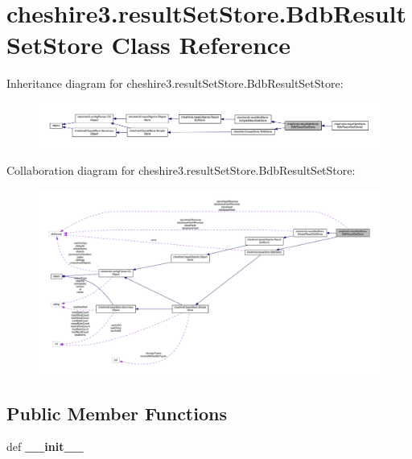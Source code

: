 \hypertarget{classcheshire3_1_1result_set_store_1_1_bdb_result_set_store}{\section{cheshire3.\-result\-Set\-Store.\-Bdb\-Result\-Set\-Store Class Reference}
\label{classcheshire3_1_1result_set_store_1_1_bdb_result_set_store}
}


Inheritance diagram for cheshire3.\-result\-Set\-Store.\-Bdb\-Result\-Set\-Store\-:
\nopagebreak
\begin{figure}[H]
\begin{center}
\leavevmode
\includegraphics[width=350pt]{classcheshire3_1_1result_set_store_1_1_bdb_result_set_store__inherit__graph}
\end{center}
\end{figure}


Collaboration diagram for cheshire3.\-result\-Set\-Store.\-Bdb\-Result\-Set\-Store\-:
\nopagebreak
\begin{figure}[H]
\begin{center}
\leavevmode
\includegraphics[width=350pt]{classcheshire3_1_1result_set_store_1_1_bdb_result_set_store__coll__graph}
\end{center}
\end{figure}
\subsection*{Public Member Functions}
\begin{DoxyCompactItemize}
\item 
\hypertarget{classcheshire3_1_1result_set_store_1_1_bdb_result_set_store_a5b08885130797b17da729de3345e1ed5}{def {\bfseries \-\_\-\-\_\-init\-\_\-\-\_\-}}\label{classcheshire3_1_1result_set_store_1_1_bdb_result_set_store_a5b08885130797b17da729de3345e1ed5}

\end{DoxyCompactItemize}

